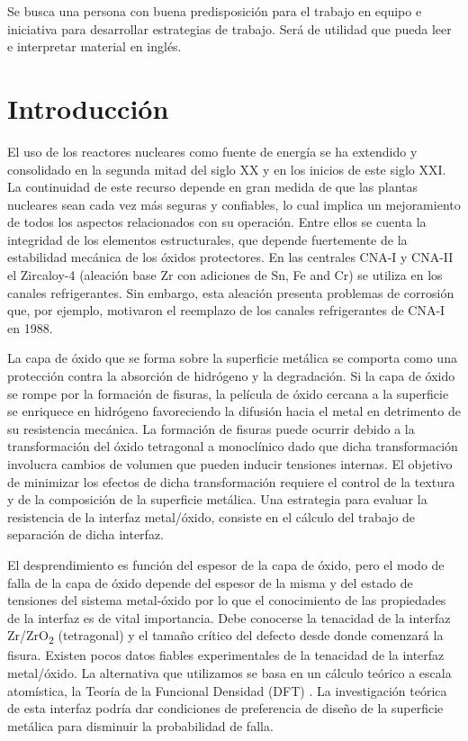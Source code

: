 Se busca una persona con buena predisposición para el trabajo
en equipo e iniciativa para desarrollar estrategias de 
trabajo. Será de utilidad que pueda leer e interpretar
material en inglés.  

\section{Introducción }

El uso de los reactores nucleares como fuente de energía se ha extendido y 
consolidado en la segunda mitad del siglo XX y en los inicios de este siglo 
XXI. La continuidad de este recurso depende en gran medida de que las plantas 
nucleares sean cada vez más seguras y confiables, lo cual implica un 
mejoramiento de todos los aspectos relacionados con su operación. Entre ellos 
se cuenta la integridad de los elementos estructurales, que depende fuertemente 
de la estabilidad mecánica de los óxidos protectores. En las centrales CNA-I y 
CNA-II el Zircaloy-4 (aleación base Zr con adiciones de Sn, Fe and Cr) se 
utiliza en los canales refrigerantes\cite{Estevez2000}. Sin embargo, esta 
aleación presenta 
problemas de corrosión que, por ejemplo, motivaron el reemplazo de los canales 
refrigerantes de CNA-I en 1988.

La capa de óxido que se forma sobre la superficie metálica se comporta como una 
protección contra la absorción de hidrógeno y la degradación. Si la capa de 
óxido se rompe por la formación de fisuras, la película de óxido cercana a la 
superficie se enriquece en hidrógeno favoreciendo la difusión hacia el metal en 
detrimento de su resistencia mecánica. La formación de fisuras puede ocurrir 
debido a la transformación del óxido tetragonal a monoclínico dado que dicha 
transformación involucra cambios de volumen que pueden inducir tensiones 
internas. El objetivo de minimizar los efectos de dicha transformación requiere 
el control de la textura y de la composición de la superficie metálica. Una 
estrategia para evaluar la resistencia de la interfaz metal/óxido, consiste en 
el cálculo del trabajo de separación de dicha interfaz.

El desprendimiento es función del espesor de la capa de óxido\cite{Schutze2005},
pero el modo 
de falla de la capa de óxido depende del espesor de la misma y del estado de 
tensiones del sistema metal-óxido por lo que el conocimiento de las propiedades 
de la interfaz es de vital importancia. Debe conocerse la tenacidad de la 
interfaz Zr/ZrO\textsubscript{2} (tetragonal) y el tamaño crítico del defecto desde donde 
comenzará la fisura. Existen pocos datos fiables experimentales de la tenacidad 
de la interfaz metal/óxido. La alternativa que utilizamos se basa en un cálculo 
teórico a escala atomística, la Teoría de la Funcional Densidad (DFT) 
\cite{KohnSham65,HohenbergKohn64}. La 
investigación teórica de esta interfaz podría dar condiciones de preferencia de 
diseño de la superficie metálica para disminuir la probabilidad de falla.

